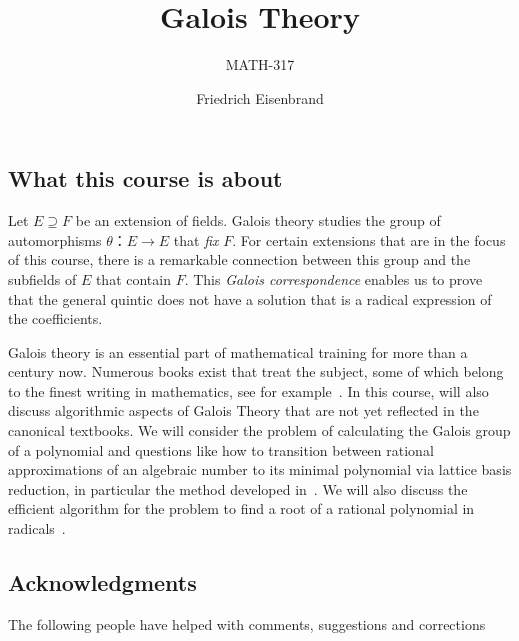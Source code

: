 \documentclass[a4paper,12pt,american]{scrbook}
\title{Galois Theory }
\subtitle{MATH-317}
\author{Friedrich Eisenbrand}
\theoremstyle{plain}
\theoremstyle{definition}
\begin{document}
 

\maketitle

\subsection*{What this course is about}
Let $E ⊇ F$ be an extension of fields. Galois theory studies the group of automorphisms $θ： E → E$ that \emph{fix} $F$. For certain extensions that are in the focus of this course, there is a remarkable connection between this group and the subfields of $E$ that contain $F$. This   \emph{Galois correspondence} enables us to  prove that the general quintic does not have a solution that is a radical expression of the coefficients.

Galois theory is an essential part of mathematical training for more than a century now. Numerous books exist that treat the subject, some of which belong to the finest writing in mathematics, see for example~\cite{van1950moderne,artin1942galois,nicholson2012introduction}. In this course,  will also discuss algorithmic aspects of Galois Theory that are not yet reflected in the canonical textbooks. We will consider the problem of calculating the Galois group of a polynomial and questions like how to transition between rational approximations of an algebraic number to its minimal polynomial via lattice basis reduction, in particular the method developed in~\cite{kannan1988polynomial}. We will also discuss the efficient algorithm for the problem to find a root of a rational polynomial in radicals~\cite{landau1985solvability}.



 \subsection*{Acknowledgments}
  The following people have helped with comments, suggestions and corrections


 \tableofcontents


 
  
  
   



\end{document}
